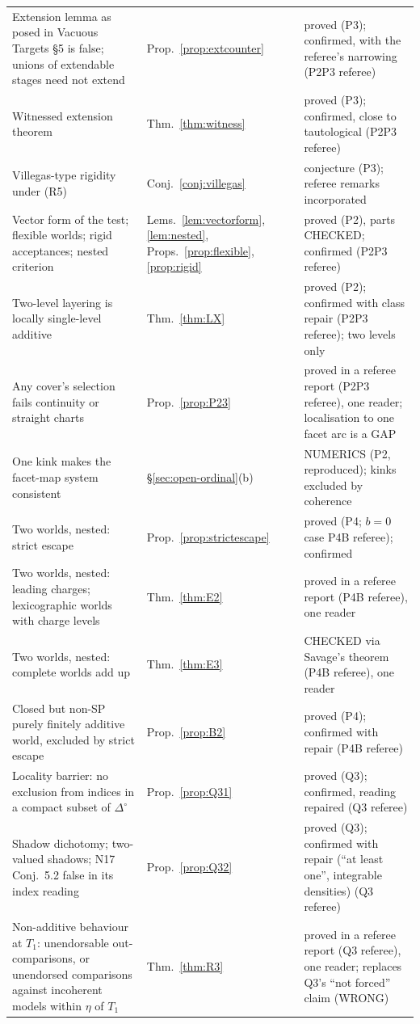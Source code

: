 \documentclass[11pt]{article}
\theoremstyle{definition}
\theoremstyle{remark}
\newcommand{\Di}{\Delta^{\circ}}
\begin{document}
{\begin{longtable}{>{\raggedright\arraybackslash}p{6.4cm}>{\raggedright\arraybackslash}p{2.1cm}>{\raggedright\arraybackslash}p{5.6cm}}
Extension lemma as posed in Vacuous Targets \S5 is false; unions of extendable stages need not extend & Prop.~\ref{prop:extcounter} & proved (P3); confirmed, with the referee's narrowing (P2P3 referee)\\
Witnessed extension theorem & Thm.~\ref{thm:witness} & proved (P3); confirmed, close to tautological (P2P3 referee)\\
Villegas-type rigidity under (R5) & Conj.~\ref{conj:villegas} & conjecture (P3); referee remarks incorporated\\
Vector form of the test; flexible worlds; rigid acceptances; nested criterion & Lems.~\ref{lem:vectorform}, \ref{lem:nested}, Props.~\ref{prop:flexible}, \ref{prop:rigid} & proved (P2), parts CHECKED; confirmed (P2P3 referee)\\
Two-level layering is locally single-level additive & Thm.~\ref{thm:LX} & proved (P2); confirmed with class repair (P2P3 referee); two levels only\\
Any cover's selection fails continuity or straight charts & Prop.~\ref{prop:P23} & proved in a referee report (P2P3 referee), one reader; localisation to one facet arc is a GAP\\
One kink makes the facet-map system consistent & \S\ref{sec:open-ordinal}(b) & NUMERICS (P2, reproduced); kinks excluded by coherence\\
Two worlds, nested: strict escape & Prop.~\ref{prop:strictescape} & proved (P4; $b=0$ case P4B referee); confirmed\\
Two worlds, nested: leading charges; lexicographic worlds with charge levels & Thm.~\ref{thm:E2} & proved in a referee report (P4B referee), one reader\\
Two worlds, nested: complete worlds add up & Thm.~\ref{thm:E3} & CHECKED via Savage's theorem (P4B referee), one reader\\
Closed but non-SP purely finitely additive world, excluded by strict escape & Prop.~\ref{prop:B2} & proved (P4); confirmed with repair (P4B referee)\\
Locality barrier: no exclusion from indices in a compact subset of $\Di$ & Prop.~\ref{prop:Q31} & proved (Q3); confirmed, reading repaired (Q3 referee)\\
Shadow dichotomy; two-valued shadows; N17 Conj.~5.2 false in its index reading & Prop.~\ref{prop:Q32} & proved (Q3); confirmed with repair (``at least one'', integrable densities) (Q3 referee)\\
Non-additive behaviour at $T_1$: unendorsable out-comparisons, or unendorsed comparisons against incoherent models within $\eta$ of $T_1$ & Thm.~\ref{thm:R3} & proved in a referee report (Q3 referee), one reader; replaces Q3's ``not forced'' claim (WRONG)\\

\end{longtable}}
\end{document}
